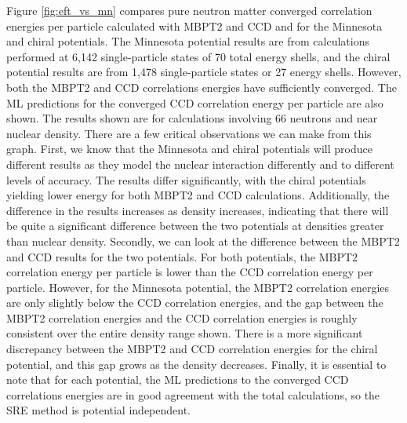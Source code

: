 Figure \ref{fig:eft_vs_mn} compares pure neutron matter converged correlation energies per particle calculated with MBPT2 and CCD and for the Minnesota and chiral potentials. The Minnesota potential results are from calculations performed at 6,142 single-particle states of 70 total energy shells, and the chiral potential results are from 1,478 single-particle states or 27 energy shells. However, both the MBPT2 and CCD correlations energies have sufficiently converged. The ML predictions for the converged CCD correlation energy per particle are also shown. The results shown are for calculations involving 66 neutrons and near nuclear density. There are a few critical observations we can make from this graph. First, we know that the Minnesota and chiral potentials will produce different results as they model the nuclear interaction differently and to different levels of accuracy. The results differ significantly, with the chiral potentials yielding lower energy for both MBPT2 and CCD calculations.
Additionally, the difference in the results increases as density increases, indicating that there will be quite a significant difference between the two potentials at densities greater than nuclear density. Secondly, we can look at the difference between the MBPT2 and CCD results for the two potentials. For both potentials, the MBPT2 correlation energy per particle is lower than the CCD correlation energy per particle. However, for the Minnesota potential, the MBPT2 correlation energies are only slightly below the CCD correlation energies, and the gap between the MBPT2 correlation energies and the CCD correlation energies is roughly consistent over the entire density range shown. There is a more significant discrepancy between the MBPT2 and CCD correlation energies for the chiral potential, and this gap grows as the density decreases. Finally, it is essential to note that for each potential, the ML predictions to the converged CCD correlations energies are in good agreement with the total calculations, so the SRE method is potential independent.
